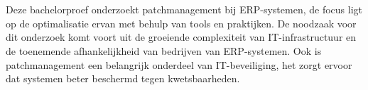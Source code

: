 
%
%
%
%
%

%



\chapter*{}


Deze bachelorproef onderzoekt patchmanagement bij ERP-systemen, de focus ligt op de optimalisatie ervan met behulp van tools en praktijken. De noodzaak voor dit onderzoek komt voort uit de groeiende complexiteit van IT-infrastructuur en de toenemende afhankelijkheid van bedrijven van ERP-systemen. Ook is patchmanagement een belangrijk onderdeel van IT-beveiliging, het zorgt ervoor dat systemen beter beschermd tegen kwetsbaarheden.

